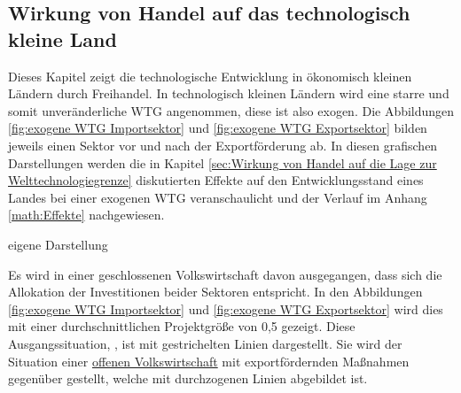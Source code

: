 \subsection{Wirkung von Handel auf das technologisch kleine Land}\label{sec:Wirkung von Handel auf das technologisch kleine Land}
Dieses  Kapitel zeigt  die technologische Entwicklung in ökonomisch kleinen Ländern durch Freihandel. In technologisch kleinen Ländern wird eine starre und somit unveränderliche WTG angenommen, diese ist also exogen. Die Abbildungen \ref{fig:exogene WTG Importsektor} und \ref{fig:exogene WTG Exportsektor} bilden jeweils einen Sektor vor und nach der Exportförderung ab. In diesen grafischen Darstellungen werden die in Kapitel \ref{sec:Wirkung von Handel auf die Lage zur Welttechnologiegrenze} diskutierten Effekte auf den Entwicklungsstand eines Landes bei einer exogenen WTG veranschaulicht und der Verlauf im Anhang \ref{math:Effekte} nachgewiesen. 
%
	\begin{figure*}[htb]
  	\hfill{}  eigene Darstellung
		\caption{exogene WTG im Importsektor}
		\label{fig:exogene WTG Importsektor}
	\end{figure*}
%
Es wird in einer geschlossenen Volkswirtschaft davon ausgegangen, dass sich die Allokation der Investitionen beider Sektoren entspricht. In den Abbildungen \ref{fig:exogene WTG Importsektor} und \ref{fig:exogene WTG Exportsektor}  wird dies mit einer durchschnittlichen Projektgröße von 0,5 gezeigt. Diese Ausgangssituation, , ist mit gestrichelten Linien dargestellt. Sie wird der Situation einer \uline{offenen Volkswirtschaft} mit exportfördernden Maßnahmen gegenüber gestellt, welche mit durchzogenen Linien abgebildet ist. \\
%

